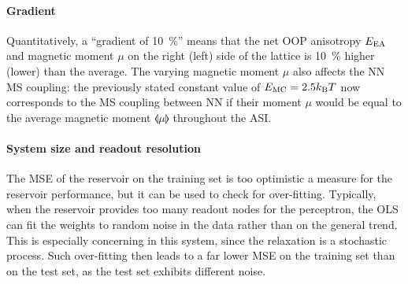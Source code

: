 \paragraph{Gradient}
Quantitatively, a ``gradient of \SI{10}{\percent}'' means that the net OOP anisotropy $E_\mathrm{EA}$ and magnetic moment $\mu$ on the right (left) side of the lattice is \SI{10}{\percent} higher (lower) than the average.
The varying magnetic moment $\mu$ also affects the NN MS coupling: the previously stated constant value of $\EMC = 2.5 \kBT$ now corresponds to the MS coupling between NN if their moment $\mu$ would be equal to the average magnetic moment $\llangle \mu \rrangle$ throughout the ASI. \par
{}

\paragraph{System size and readout resolution}
The MSE of the reservoir on the training set is too optimistic a measure for the reservoir performance, but it can be used to check for over-fitting.
Typically, when the reservoir provides too many readout nodes for the perceptron, the OLS can fit the weights to random noise in the data rather than on the general trend.
This is especially concerning in this system, since the relaxation is a stochastic process.
Such over-fitting then leads to a far lower MSE on the training set than on the test set, as the test set exhibits different noise.

